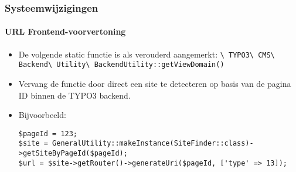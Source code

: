 
\begin{frame}[fragile]
	\frametitle{Systeemwijzigingen}
	\framesubtitle{URL Frontend-voorvertoning}

	\lstset{basicstyle=\tiny\ttfamily}

	\begin{itemize}
		\item De volgende static functie is als verouderd aangemerkt:\newline
			\smaller\texttt{\textbackslash
				TYPO3\textbackslash
				CMS\textbackslash
				Backend\textbackslash
				Utility\textbackslash
				BackendUtility::getViewDomain()}\normalsize

		\item Vervang de functie door direct een site te detecteren op basis van de pagina ID binnen de TYPO3 backend.
		\item Bijvoorbeeld:
\begin{lstlisting}
$pageId = 123;
$site = GeneralUtility::makeInstance(SiteFinder::class)->getSiteByPageId($pageId);
$url = $site->getRouter()->generateUri($pageId, ['type' => 13]);
\end{lstlisting}

	\end{itemize}

\end{frame}


